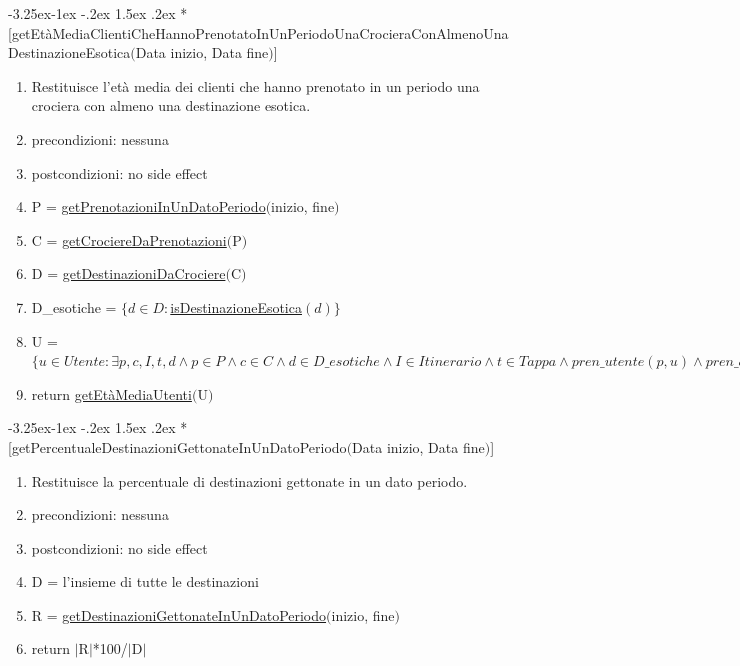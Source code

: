 \documentclass{article}
\makeatletter
\renewcommand\subsection{\@startsection{subsection}{2}{\z@}%
                                     {-3.25ex\@plus -1ex \@minus -.2ex}%
                                     {1.5ex \@plus .2ex}%
                                     {\normalfont\normalsize\bfseries}}
\makeatother
\begin{document}
\subsection*{\label{sec:OperazioneGetEtàMediaClientiCheHannoPrenotatoInUnPeriodoUnaCrocieraConAlmenoUnaDestinazioneEsotica}[getEtàMediaClientiCheHannoPrenotatoInUnPeriodoUnaCrocieraConAlmenoUnaDestinazioneEsotica$($Data inizio, Data fine$)$]}
\begin{enumerate}
    \item Restituisce l'età media dei clienti che hanno prenotato in un periodo una crociera con almeno una destinazione esotica.
    \item precondizioni: nessuna
    \item postcondizioni: no side effect
    \item P = \hyperref[sec:OperazioneGetPrenotazioniInUnDatoPeriodo]{getPrenotazioniInUnDatoPeriodo}$($inizio, fine$)$
    \item C = \hyperref[sec:OperazioneGetCrociereDaPrenotazioni]{getCrociereDaPrenotazioni}$($P$)$
    \item D = \hyperref[sec:OperazioneGetDestinazioniDaCrociere]{getDestinazioniDaCrociere}$($C$)$
    \item D\_esotiche = $\{d \in D: $\hyperref[sec:OperazioneIsDestinazioneEsotica]{isDestinazioneEsotica}$(d)\}$
    \item U = $\{u \in Utente: \exists p, c, I, t, d \land p \in P \land c \in C \land d \in D\_esotiche \land I \in Itinerario \land t \in Tappa \land pren\_utente(p,u) \land pren\_croc(p,c) \land itin\_croc(I,c) \land tappa\_itin(t,I) \land tappa\_dest(t,d)\}$
    \item return \hyperref[sec:OperazioneGetEtàMediaUtenti]{getEtàMediaUtenti}$($U$)$
\end{enumerate}

\subsection*{\label{sec:OperazioneGetPercentualeDestinazioniGettonateInUnDatoPeriodo}[getPercentualeDestinazioniGettonateInUnDatoPeriodo$($Data inizio, Data fine$)$]}
\begin{enumerate}
    \item Restituisce la percentuale di destinazioni gettonate in un dato periodo.
    \item precondizioni: nessuna
    \item postcondizioni: no side effect
    \item D = l'insieme di tutte le destinazioni
    \item R = \hyperref[sec:OperazioneGetDestinazioniGettonateInUnDatoPeriodo]{getDestinazioniGettonateInUnDatoPeriodo}$($inizio, fine$)$
    \item return $|$R$|$*100/$|$D$|$
\end{enumerate}
\end{document}
